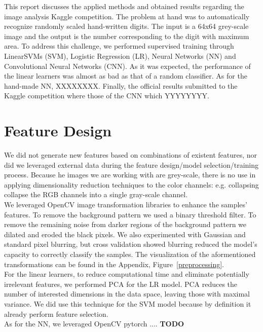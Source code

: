 \documentclass[10pt, hidelinks]{article}
\begin{document}
This report discusses the applied methods and obtained results regarding the image analysis Kaggle competition. The problem at hand was to automatically recognize randomly scaled hand-written digits. The input is a 64x64 grey-scale image and the output is the number corresponding to the digit with maximum area. To address this challenge, we performed supervised training through LinearSVMs (SVM), Logistic Regression (LR), Neural Networks (NN) and Convolutional Neural Networks (CNN). As it was expected, the performance of the linear learners was almost as bad as that of a random classifier. As for the hand-made NN, XXXXXXXX. Finally, the official results submitted to the Kaggle competition where those of the CNN which YYYYYYYY.

\section*{Feature Design}

We did not generate new features based on combinations of existent features, nor did we leveraged external data during the feature design/model selection/training process. Because he images we are working with are grey-scale, there is no use in applying dimensionality reduction techniques to the color channels: e.g. collapsing collapse the RGB channels into a single gray-scale channel.\\
\noindent We leveraged OpenCV image transformation libraries to enhance the samples' features. To remove the background pattern we used a binary threshold filter. To remove the remaining noise from darker regions of the background pattern we dilated and eroded the black pixels. We also experimented with Gaussian and standard pixel blurring, but cross validation showed blurring reduced the model's capacity to correctly classify the samples. The visualization of the aformentioned transformations can be found in the Appendix, Figure~\ref{preprocessing}.\\
\noindent For the linear learners, to reduce computational time and eliminate potentially irrelevant features, we performed PCA for the LR model. PCA reduces the number of interested dimensions in the data space, leaving those with maximal variance. We did use this technique for the SVM model because by definition it already perform feature selection.\\
\noindent As for the NN, we leveraged OpenCV pytorch  .... \textbf{TODO}
\end{document}
